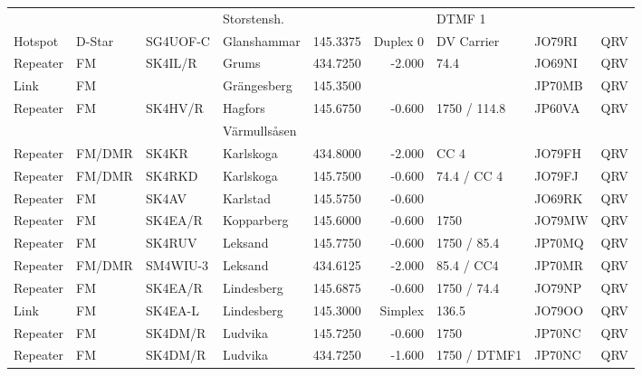 \begin{landscape}
\begin{longtable}{llllrrlll}
         &            &          & Storstensh.         &              &            & DTMF 1        &             &          \\
Hotspot  & D-Star     & SG4UOF-C & Glanshammar         & 145.3375     & Duplex 0   & DV Carrier    & JO79RI      & QRV      \\
Repeater & FM         & SK4IL/R  & Grums               & 434.7250     & -2.000     & 74.4          & JO69NI      & QRV      \\
Link     & FM         &          & Grängesberg         & 145.3500     &            &               & JP70MB      & QRV      \\
Repeater & FM         & SK4HV/R  & Hagfors             & 145.6750     & -0.600     & 1750 / 114.8  & JP60VA      & QRV      \\
         &            &          & Värmullsåsen        &              &            &               &             &          \\
Repeater & FM/DMR     & SK4KR    & Karlskoga           & 434.8000     & -2.000     & CC 4          & JO79FH      & QRV      \\
Repeater & FM/DMR     & SK4RKD   & Karlskoga           & 145.7500     & -0.600     & 74.4 / CC 4   & JO79FJ      & QRV      \\
Repeater & FM         & SK4AV    & Karlstad            & 145.5750     & -0.600     &               & JO69RK      & QRV      \\
Repeater & FM         & SK4EA/R  & Kopparberg          & 145.6000     & -0.600     & 1750          & JO79MW      & QRV      \\
Repeater & FM         & SK4RUV   & Leksand             & 145.7750     & -0.600     & 1750 / 85.4   & JP70MQ      & QRV      \\
Repeater & FM/DMR     & SM4WIU-3 & Leksand             & 434.6125     & -2.000     & 85.4 / CC4    & JP70MR      & QRV      \\
Repeater & FM         & SK4EA/R  & Lindesberg          & 145.6875     & -0.600     & 1750 / 74.4   & JO79NP      & QRV      \\
Link     & FM         & SK4EA-L  & Lindesberg          & 145.3000     & Simplex    & 136.5         & JO79OO      & QRV      \\
Repeater & FM         & SK4DM/R  & Ludvika             & 145.7250     & -0.600     & 1750          & JP70NC      & QRV      \\
Repeater & FM         & SK4DM/R  & Ludvika             & 434.7250     & -1.600     & 1750 / DTMF1  & JP70NC      & QRV      \\

\end{longtable}
\end{landscape}

